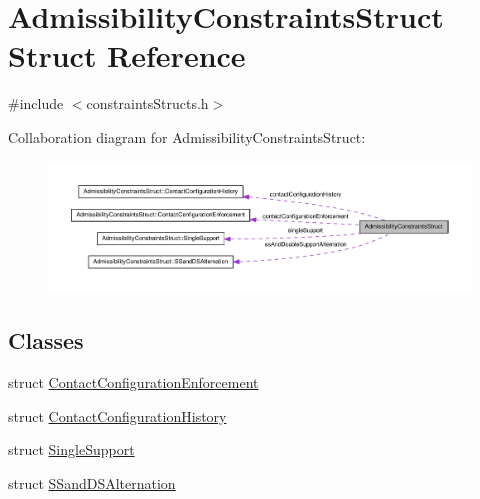 \hypertarget{structAdmissibilityConstraintsStruct}{\section{\-Admissibility\-Constraints\-Struct \-Struct \-Reference}
\label{structAdmissibilityConstraintsStruct}
}


{\ttfamily \#include $<$constraints\-Structs.\-h$>$}



\-Collaboration diagram for \-Admissibility\-Constraints\-Struct\-:
\nopagebreak
\begin{figure}[H]
\begin{center}
\leavevmode
\includegraphics[width=350pt]{structAdmissibilityConstraintsStruct__coll__graph}
\end{center}
\end{figure}
\subsection*{\-Classes}
\begin{DoxyCompactItemize}
\item 
struct \hyperlink{structAdmissibilityConstraintsStruct_1_1ContactConfigurationEnforcement}{\-Contact\-Configuration\-Enforcement}
\item 
struct \hyperlink{structAdmissibilityConstraintsStruct_1_1ContactConfigurationHistory}{\-Contact\-Configuration\-History}
\item 
struct \hyperlink{structAdmissibilityConstraintsStruct_1_1SingleSupport}{\-Single\-Support}
\item 
struct \hyperlink{structAdmissibilityConstraintsStruct_1_1SSandDSAlternation}{\-S\-Sand\-D\-S\-Alternation}
\end{DoxyCompactItemize}
